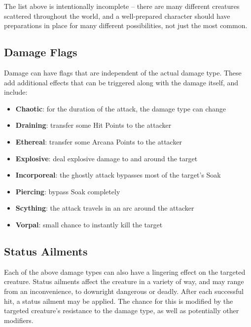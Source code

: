The list above is intentionally incomplete -- there are many different
creatures scattered throughout the world, and a well-prepared character 
should have preparations in place for many different possibilities, not 
just the most common.

\subsection{Damage Flags}

Damage can have flags that are independent of the actual damage type.
These add additional effects that can be triggered along with the damage
itself, and include:

\begin{itemize}
\item {\bf Chaotic}: for the duration of the attack, the damage type can change
\item {\bf Draining}: transfer some Hit Points to the attacker
\item {\bf Ethereal}: transfer some Arcana Points to the attacker
\item {\bf Explosive}: deal explosive damage to and around the target
\item {\bf Incorporeal}: the ghostly attack bypasses most of the target's Soak
\item {\bf Piercing}: bypass Soak completely
\item {\bf Scything}: the attack travels in an arc around the attacker
\item {\bf Vorpal}: small chance to instantly kill the target
\end{itemize}

\subsection{Status Ailments}

Each of the above damage types can also have a lingering effect on the
targeted creature.  Status ailments affect the creature in a variety of
way, and may range from an inconvenience, to downright dangerous or
deadly.  After each successful hit, a status ailment may be applied.  The
chance for this is modified by the targeted creature's resistance to the
damage type, as well as potentially other modifiers.

